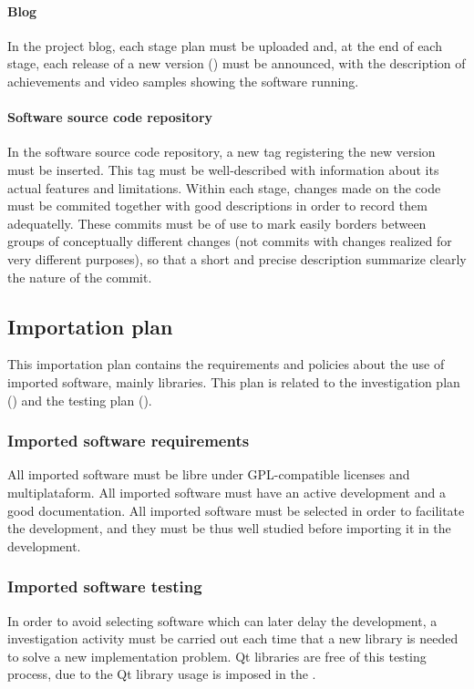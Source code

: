 \documentclass[twocolumn]{article}
\begin{document}
\paragraph{Blog}
In the project blog, each stage plan must be uploaded and, at the end
of each stage, each release of a new version ()
must be announced, with the description of achievements and video
samples showing the software running.

\paragraph{Software source code repository}
In the software source code repository, a new tag registering the new
version must be inserted. This tag must be well-described with
information about its actual features and limitations. Within each
stage, changes made on the code must be commited together with good
descriptions in order to record them adequatelly. These commits must
be of use to mark easily borders between groups of conceptually
different changes (not commits with changes realized for
very different purposes), so that a short and precise description
summarize clearly the nature of the commit.

\subsection{Importation plan}
\label{ssec:importation-plan}
This importation plan contains the requirements and policies about the
use of imported software, mainly libraries. This plan is related to
the investigation plan () and the
testing plan ().

\subsubsection{Imported software requirements}
All imported software must be libre under GPL-compatible
licenses and multiplataform. All imported software must have an active
development and a good documentation. All imported software must be
selected in order to facilitate the development, and they must be thus
well studied before importing it in the \fav development.

\subsubsection{Imported software testing}
\label{sssec:imported-software}
In order to avoid selecting software which can later delay the
development, a investigation activity must be carried out each time
that a new library is needed to solve a new implementation problem. Qt
libraries are free of this testing process, due to the Qt library
usage is imposed in the \favc.
\end{document}
